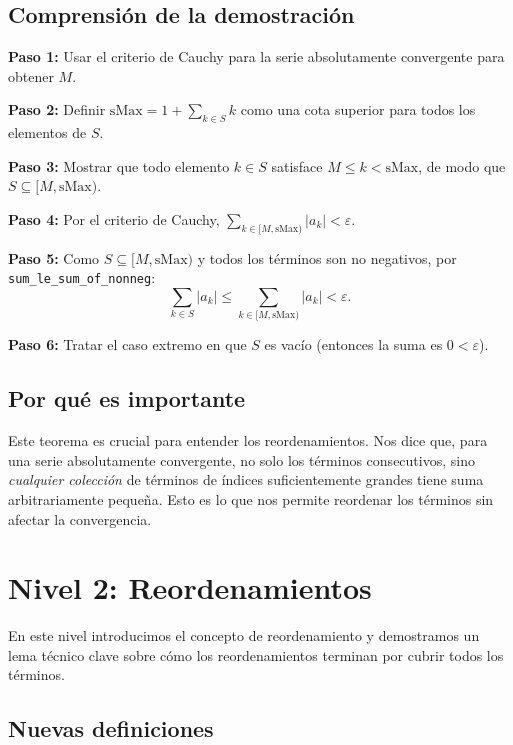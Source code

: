 \subsection{Comprensión de la demostración}

\textbf{Paso 1:} Usar el criterio de Cauchy para la serie absolutamente convergente para obtener $M$.

\textbf{Paso 2:} Definir $\mathrm{sMax} = 1 + \sum_{k \in S} k$ como una cota superior para todos los elementos de $S$.

\textbf{Paso 3:} Mostrar que todo elemento $k \in S$ satisface $M \le k < \mathrm{sMax}$, de modo que $S \subseteq [M, \mathrm{sMax})$.

\textbf{Paso 4:} Por el criterio de Cauchy, $\sum_{k \in [M, \mathrm{sMax})} |a_k| < \varepsilon$.

\textbf{Paso 5:} Como $S \subseteq [M, \mathrm{sMax})$ y todos los términos son no negativos, por \texttt{sum\_le\_sum\_of\_nonneg}:
\[
  \sum_{k \in S} |a_k| \le \sum_{k \in [M, \mathrm{sMax})} |a_k| < \varepsilon .
\]

\textbf{Paso 6:} Tratar el caso extremo en que $S$ es vacío (entonces la suma es $0 < \varepsilon$).

\subsection{Por qué es importante}

Este teorema es crucial para entender los reordenamientos. Nos dice que, para una serie absolutamente convergente, no solo los términos consecutivos, sino \emph{cualquier colección} de términos de índices suficientemente grandes tiene suma arbitrariamente pequeña. Esto es lo que nos permite reordenar los términos sin afectar la convergencia.

\section{Nivel 2: Reordenamientos}

En este nivel introducimos el concepto de reordenamiento y demostramos un lema técnico clave sobre cómo los reordenamientos terminan por cubrir todos los términos.

\subsection{Nuevas definiciones}

